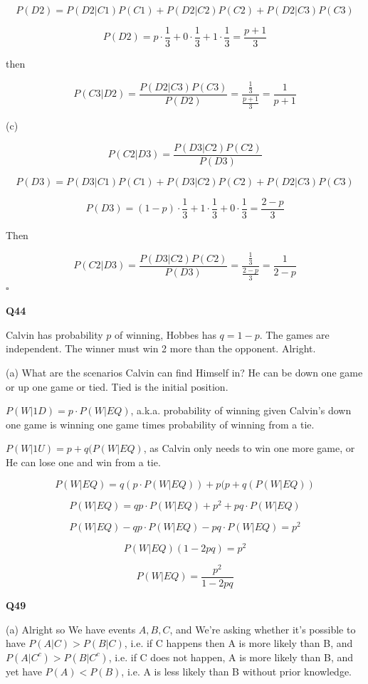 \documentclass{article}
\newcommand{\qed}{\hfill$\square$}
\begin{document}
			$$P(D2) = P(D2\vert C1)P(C1) + P(D2\vert C2)P(C2) + P(D2\vert C3)P(C3)$$
			
			$$P(D2) = p\cdot\frac{1}{3} + 0\cdot\frac{1}{3} + 1\cdot\frac{1}{3} = \frac{p+1}{3}$$
			
			then
			
			$$P(C3\vert D2) = \frac{P(D2\vert C3)P(C3)}{P(D2)} = \frac{\frac{1}{3}}{\frac{p+1}{3}} = \frac{1}{p+1}$$
			
			(c) 
			
			$$P(C2\vert D3) = \frac{P(D3\vert C2)P(C2)}{P(D3)}$$
			
			$$P(D3) = P(D3\vert C1)P(C1) + P(D3\vert C2)P(C2) + P(D2\vert C3)P(C3)$$
			
			$$P(D3) = (1-p)\cdot\frac{1}{3} + 1\cdot\frac{1}{3} + 0\cdot\frac{1}{3} = \frac{2-p}{3}$$
			
			Then
			
			$$P(C2\vert D3) = \frac{P(D3\vert C2)P(C2)}{P(D3)} = \frac{\frac{1}{3}}{\frac{2-p}{3}} = \frac{1}{2-p}$$\qed
			
		\hfill
		
		\textbf{Q44}
		
			Calvin has probability $p$ of winning, Hobbes has $q = 1-p$. The games are independent. The winner must win 2 more than the opponent. Alright.
			
			(a) What are the scenarios Calvin can find Himself in?  He can be down one game or up one game or tied. Tied is the initial position.
			
			$P(W\vert 1D) = p \cdot P(W\vert EQ)$, a.k.a. probability of winning given Calvin's down one game is winning one game times probability of winning from a tie. 
			
			$P(W\vert 1U) = p + q(P(W\vert EQ)$, as Calvin only needs to win one more game, or He can lose one and win from a tie.
			
			$$P(W\vert EQ) = q(p \cdot P(W\vert EQ)) + p(p + q(P(W\vert EQ))$$
			
			$$P(W\vert EQ) = qp \cdot P(W\vert EQ) + p^2 + pq\cdot P(W\vert EQ)$$
			
			$$P(W\vert EQ) - qp \cdot P(W\vert EQ) - pq\cdot P(W\vert EQ) = p^2$$
			
			$$P(W\vert EQ)(1 - 2pq) = p^2$$
			
			$$P(W\vert EQ) = \frac{p^2}{1-2pq}$$
			
		\textbf{Q49}
		
			(a) Alright so We have events $A, B, C$, and We're asking whether it's possible to have $P(A\vert C) > P(B\vert C)$, i.e. if C happens then A is more likely than B, and $P(A\vert C^c) > P(B\vert C^c)$, i.e. if C does not happen, A is more likely than B, and yet have $P(A) < P(B)$, i.e. A is less likely than B without prior knowledge.
			
\end{document}
